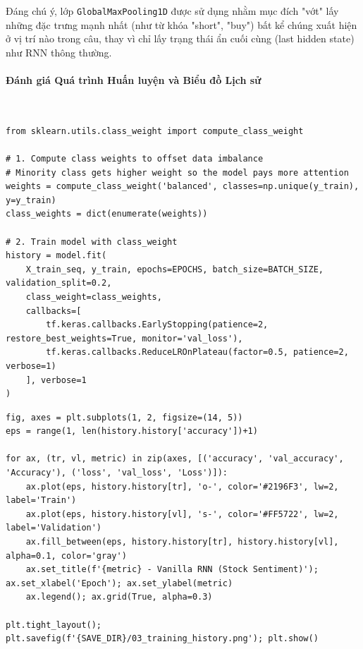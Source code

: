 Đáng chú ý, lớp \texttt{GlobalMaxPooling1D} được sử dụng nhằm mục đích "vớt" lấy những đặc trưng mạnh nhất (như từ khóa "short", "buy") bất kể chúng xuất hiện ở vị trí nào trong câu, thay vì chỉ lấy trạng thái ẩn cuối cùng (last hidden state) như RNN thông thường.

\paragraph{Đánh giá Quá trình Huấn luyện và Biểu đồ Lịch sử} \hfill \\

\begin{lstlisting}[style=pythoncode, caption={Huấn luyện cùng với kỹ thuật bù trừ Class Weights}]
from sklearn.utils.class_weight import compute_class_weight

# 1. Compute class weights to offset data imbalance
# Minority class gets higher weight so the model pays more attention
weights = compute_class_weight('balanced', classes=np.unique(y_train), y=y_train)
class_weights = dict(enumerate(weights))

# 2. Train model with class_weight
history = model.fit(
    X_train_seq, y_train, epochs=EPOCHS, batch_size=BATCH_SIZE, validation_split=0.2,
    class_weight=class_weights,
    callbacks=[
        tf.keras.callbacks.EarlyStopping(patience=2, restore_best_weights=True, monitor='val_loss'),
        tf.keras.callbacks.ReduceLROnPlateau(factor=0.5, patience=2, verbose=1)
    ], verbose=1
)
\end{lstlisting}

\begin{lstlisting}[style=pythoncode, caption={Trực quan hóa sự biến thiên của Loss và Accuracy}]
fig, axes = plt.subplots(1, 2, figsize=(14, 5))
eps = range(1, len(history.history['accuracy'])+1)

for ax, (tr, vl, metric) in zip(axes, [('accuracy', 'val_accuracy', 'Accuracy'), ('loss', 'val_loss', 'Loss')]):
    ax.plot(eps, history.history[tr], 'o-', color='#2196F3', lw=2, label='Train')
    ax.plot(eps, history.history[vl], 's-', color='#FF5722', lw=2, label='Validation')
    ax.fill_between(eps, history.history[tr], history.history[vl], alpha=0.1, color='gray')
    ax.set_title(f'{metric} - Vanilla RNN (Stock Sentiment)'); ax.set_xlabel('Epoch'); ax.set_ylabel(metric)
    ax.legend(); ax.grid(True, alpha=0.3)

plt.tight_layout(); plt.savefig(f'{SAVE_DIR}/03_training_history.png'); plt.show()
\end{lstlisting}

